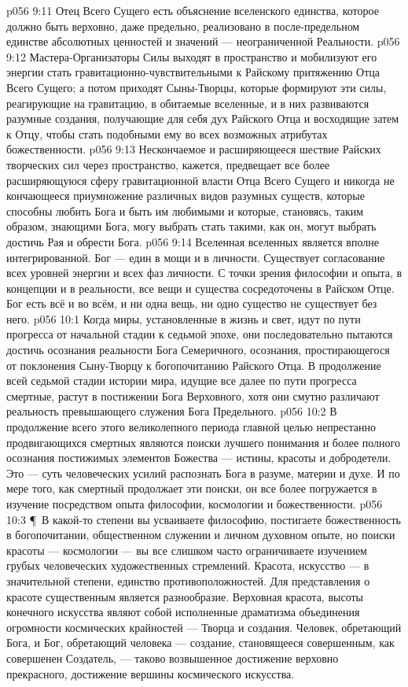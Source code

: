 \vs p056 9:11 Отец Всего Сущего есть объяснение вселенского единства, которое должно быть верховно, даже предельно, реализовано в после\hyp{}предельном единстве абсолютных ценностей и значений --- неограниченной Реальности.
\vs p056 9:12 Мастера\hyp{}Организаторы Силы выходят в пространство и мобилизуют его энергии стать гравитационно\hyp{}чувствительными к Райскому притяжению Отца Всего Сущего; а потом приходят Сыны\hyp{}Творцы, которые формируют эти силы, реагирующие на гравитацию, в обитаемые вселенные, и в них развиваются разумные создания, получающие для себя дух Райского Отца и восходящие затем к Отцу, чтобы стать подобными ему во всех возможных атрибутах божественности.
\vs p056 9:13 Нескончаемое и расширяющееся шествие Райских творческих сил через пространство, кажется, предвещает все более расширяющуюся сферу гравитационной власти Отца Всего Сущего и никогда не кончающееся приумножение различных видов разумных существ, которые способны любить Бога и быть им любимыми и которые, становясь, таким образом, знающими Бога, могу выбрать стать такими, как он, могут выбрать достичь Рая и обрести Бога.
\vs p056 9:14 Вселенная вселенных является вполне интегрированной. Бог --- един в мощи и в личности. Существует согласование всех уровней энергии и всех фаз личности. С точки зрения философии и опыта, в концепции и в реальности, все вещи и существа сосредоточены в Райском Отце. Бог есть всё и во всём, и ни одна вещь, ни одно существо не существует без него.
\vs p056 10:1 Когда миры, установленные в жизнь и свет, идут по пути прогресса от начальной стадии к седьмой эпохе, они последовательно пытаются достичь осознания реальности Бога Семеричного, осознания, простирающегося от поклонения Сыну\hyp{}Творцу к богопочитанию Райского Отца. В продолжение всей седьмой стадии истории мира, идущие все далее по пути прогресса смертные, растут в постижении Бога Верховного, хотя они смутно различают реальность превышающего служения Бога Предельного.
\vs p056 10:2 В продолжение всего этого великолепного периода главной целью непрестанно продвигающихся смертных являются поиски лучшего понимания и более полного осознания постижимых элементов Божества --- истины, красоты и добродетели. Это --- суть человеческих усилий распознать Бога в разуме, материи и духе. И по мере того, как смертный продолжает эти поиски, он все более погружается в изучение посредством опыта философии, космологии и божественности.
\vs p056 10:3 \P\ В какой\hyp{}то степени вы усваиваете философию, постигаете божественность в богопочитании, общественном служении и личном духовном опыте, но поиски красоты --- космологии --- вы все слишком часто ограничиваете изучением грубых человеческих художественных стремлений. Красота, искусство --- в значительной степени, единство противоположностей. Для представления о красоте существенным является разнообразие. Верховная красота, высоты конечного искусства являют собой исполненные драматизма объединения огромности космических крайностей --- Творца и создания. Человек, обретающий Бога, и Бог, обретающий человека --- создание, становящееся совершенным, как совершенен Создатель, --- таково возвышенное достижение верховно прекрасного, достижение вершины космического искусства.
